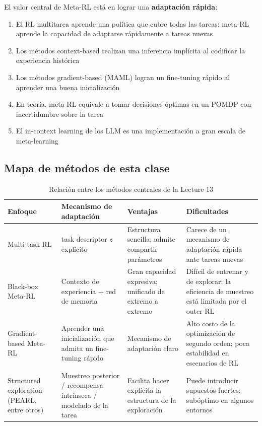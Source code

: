\documentclass[a4paper]{article}
\begin{document}
El valor central de Meta-RL está en lograr una \textbf{adaptación rápida}:

\begin{enumerate}
    \item El RL multitarea aprende una política que cubre todas las tareas; meta-RL aprende la capacidad de adaptarse rápidamente a tareas nuevas
    \item Los métodos context-based realizan una inferencia implícita al codificar la experiencia histórica
    \item Los métodos gradient-based (MAML) logran un fine-tuning rápido al aprender una buena inicialización
    \item En teoría, meta-RL equivale a tomar decisiones óptimas en un POMDP con incertidumbre sobre la tarea
    \item El in-context learning de los LLM es una implementación a gran escala de meta-learning
\end{enumerate}

\subsection{Mapa de métodos de esta clase}

\begin{table}[H]
\centering
\begin{tabular}{p{} p{} p{} p{}}
\toprule
Enfoque & Mecanismo de adaptación & Ventajas & Dificultades \\
\midrule
Multi-task RL & task descriptor $z$ explícito & Estructura sencilla; admite compartir parámetros & Carece de un mecanismo de adaptación rápida ante tareas nuevas \\
Black-box Meta-RL & Contexto de experiencia + red de memoria & Gran capacidad expresiva; unificado de extremo a extremo & Difícil de entrenar y de explorar; la eficiencia de muestreo está limitada por el outer RL \\
Gradient-based Meta-RL & Aprender una inicialización que admita un fine-tuning rápido & Mecanismo de adaptación claro & Alto costo de la optimización de segundo orden; poca estabilidad en escenarios de RL \\
Structured exploration (PEARL, entre otros) & Muestreo posterior / recompensa intrínseca / modelado de la tarea & Facilita hacer explícita la estructura de la exploración & Puede introducir supuestos fuertes; subóptimo en algunos entornos \\
\bottomrule
\end{tabular}
\caption{Relación entre los métodos centrales de la Lecture 13}
\end{table}
\end{document}
